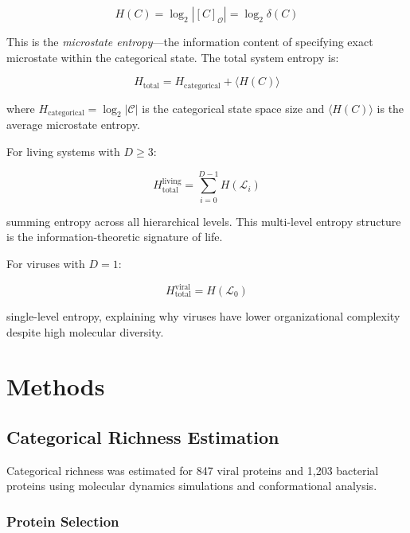 \documentclass[11pt]{article}
\begin{document}
\begin{equation}
H(C) = \log_2 |[C]_{\mathcal{O}}| = \log_2 \delta(C)
\end{equation}

This is the \textit{microstate entropy}—the information content of specifying exact microstate within the categorical state. The total system entropy is:

\begin{equation}
H_{\text{total}} = H_{\text{categorical}} + \langle H(C) \rangle
\end{equation}

where $H_{\text{categorical}} = \log_2 |\mathcal{C}|$ is the categorical state space size and $\langle H(C) \rangle$ is the average microstate entropy.

For living systems with $D \geq 3$:

\begin{equation}
H_{\text{total}}^{\text{living}} = \sum_{i=0}^{D-1} H(\mathcal{L}_i)
\end{equation}

summing entropy across all hierarchical levels. This multi-level entropy structure is the information-theoretic signature of life.

For viruses with $D = 1$:

\begin{equation}
H_{\text{total}}^{\text{viral}} = H(\mathcal{L}_0)
\end{equation}

single-level entropy, explaining why viruses have lower organizational complexity despite high molecular diversity.

\section{Methods}

\subsection{Categorical Richness Estimation}

Categorical richness was estimated for 847 viral proteins and 1,203 bacterial proteins using molecular dynamics simulations and conformational analysis.

\subsubsection{Protein Selection}
\end{document}
